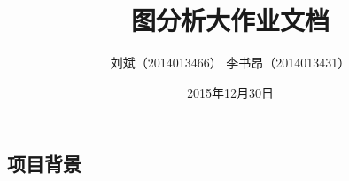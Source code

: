 \documentclass{article}
\begin{document}
\begin{CJK}{UTF8}{gkai} %
\makeatletter 
  \newcommand\figcaption{\def\@captype{figure}\caption} 
  \newcommand\tabcaption{\def\@captype{table}\caption} 
\makeatother
\renewcommand{\abstractname}{摘 \qquad 要}
\renewcommand{\contentsname}{\center 目\qquad\qquad录}
\renewcommand{\listfigurename}{图 \quad 示 \quad 目 \quad 录}
\renewcommand{\listtablename}{表 \quad 格 \quad 目 \quad 录}
\renewcommand{\appendixname}{附录}
\renewcommand{\refname}{\center 参 \quad 考 \quad 文 \quad 献}
\renewcommand{\indexname}{\center 索 \qquad 引}
\renewcommand{\figurename}{图}
\renewcommand{\tablename}{表}

\title{图分析大作业文档}
\author{刘斌（2014013466） 李书昂（2014013431）}
\date{2015年12月30日}
\maketitle

\section{项目背景} %

\end{CJK}
\end{document}
